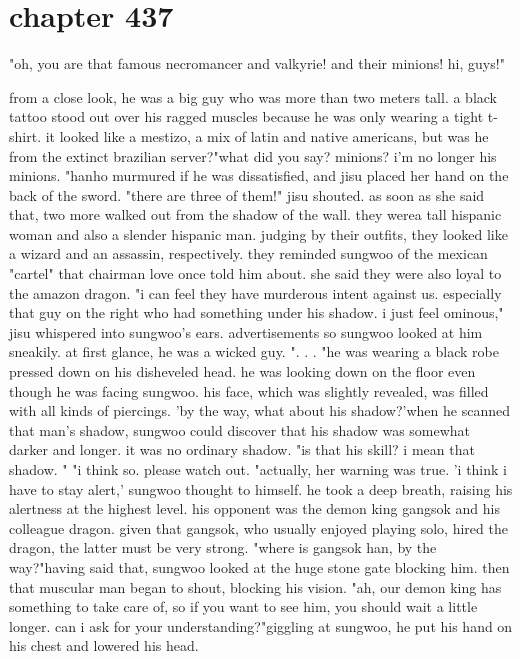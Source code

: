 \section{chapter 437}

"oh, you are that famous necromancer and valkyrie! and their minions! hi, guys!"




from a close look, he was a big guy who was more than two meters tall.
 a black tattoo stood out over his ragged muscles because he was only wearing a tight t-shirt.
it looked like a mestizo, a mix of latin and native americans, but was he from the extinct brazilian server?"what did you say? minions? i'm no longer his minions.
"hanho murmured if he was dissatisfied, and jisu placed her hand on the back of the sword.
"there are three of them!" jisu shouted.
as soon as she said that, two more walked out from the shadow of the wall.
 they werea tall hispanic woman and also a slender hispanic man.
 judging by their outfits, they looked like a wizard and an assassin, respectively.
they reminded sungwoo of the mexican "cartel" that chairman love once told him about.
 she said they were also loyal to the amazon dragon.
"i can feel they have murderous intent against us.
 especially that guy on the right who had something under his shadow.
 i just feel ominous," jisu whispered into sungwoo's ears.
advertisements    so sungwoo looked at him sneakily.
 at first glance, he was a wicked guy.
".
.
.
"he was wearing a black robe pressed down on his disheveled head.
 he was looking down on the floor even though he was facing sungwoo.
 his face, which was slightly revealed, was filled with all kinds of piercings.
'by the way, what about his shadow?'when he scanned that man's shadow, sungwoo could discover that his shadow was somewhat darker and longer.
 it was no ordinary shadow.
"is that his skill? i mean that shadow.
"
"i think so.
 please watch out.
"actually, her warning was true.
 'i think i have to stay alert,' sungwoo thought to himself.
 he took a deep breath, raising his alertness at the highest level.
 his opponent was the demon king gangsok and his colleague dragon.
given that gangsok, who usually enjoyed playing solo, hired the dragon, the latter must be very strong.
"where is gangsok han, by the way?"having said that, sungwoo looked at the huge stone gate blocking him.
then that muscular man began to shout, blocking his vision.
"ah, our demon king has something to take care of, so if you want to see him, you should wait a little longer.
 can i ask for your understanding?"giggling at sungwoo, he put his hand on his chest and lowered his head.
